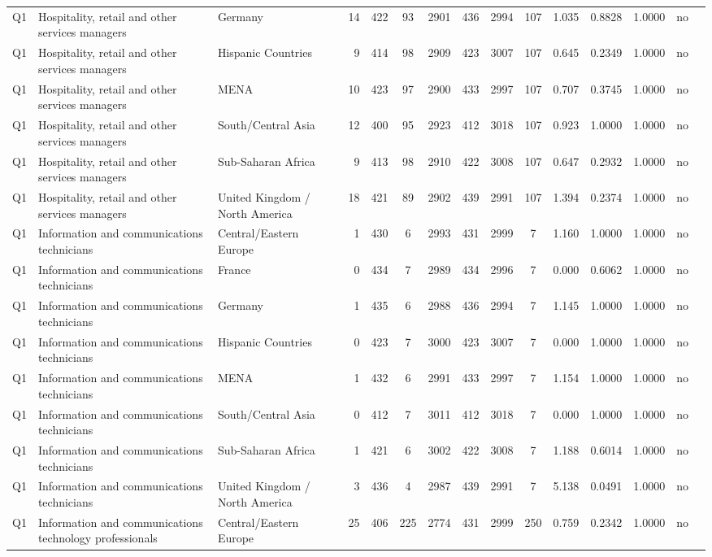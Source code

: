 \begin{longtable}{lllrcccccccccll}
Q1 & Hospitality, retail and other services managers & Germany & 14 & 422 & 93 & 2901 & 436 & 2994 & 107 & 1.035 & 0.8828 & 1.0000 & no \\
Q1 & Hospitality, retail and other services managers & Hispanic Countries & 9 & 414 & 98 & 2909 & 423 & 3007 & 107 & 0.645 & 0.2349 & 1.0000 & no \\
Q1 & Hospitality, retail and other services managers & MENA & 10 & 423 & 97 & 2900 & 433 & 2997 & 107 & 0.707 & 0.3745 & 1.0000 & no \\
Q1 & Hospitality, retail and other services managers & South/Central Asia & 12 & 400 & 95 & 2923 & 412 & 3018 & 107 & 0.923 & 1.0000 & 1.0000 & no \\
Q1 & Hospitality, retail and other services managers & Sub-Saharan Africa & 9 & 413 & 98 & 2910 & 422 & 3008 & 107 & 0.647 & 0.2932 & 1.0000 & no \\
Q1 & Hospitality, retail and other services managers & United Kingdom / North America & 18 & 421 & 89 & 2902 & 439 & 2991 & 107 & 1.394 & 0.2374 & 1.0000 & no \\
Q1 & Information and communications technicians & Central/Eastern Europe & 1 & 430 & 6 & 2993 & 431 & 2999 & 7 & 1.160 & 1.0000 & 1.0000 & no \\
Q1 & Information and communications technicians & France & 0 & 434 & 7 & 2989 & 434 & 2996 & 7 & 0.000 & 0.6062 & 1.0000 & no \\
Q1 & Information and communications technicians & Germany & 1 & 435 & 6 & 2988 & 436 & 2994 & 7 & 1.145 & 1.0000 & 1.0000 & no \\
Q1 & Information and communications technicians & Hispanic Countries & 0 & 423 & 7 & 3000 & 423 & 3007 & 7 & 0.000 & 1.0000 & 1.0000 & no \\
Q1 & Information and communications technicians & MENA & 1 & 432 & 6 & 2991 & 433 & 2997 & 7 & 1.154 & 1.0000 & 1.0000 & no \\
Q1 & Information and communications technicians & South/Central Asia & 0 & 412 & 7 & 3011 & 412 & 3018 & 7 & 0.000 & 1.0000 & 1.0000 & no \\
Q1 & Information and communications technicians & Sub-Saharan Africa & 1 & 421 & 6 & 3002 & 422 & 3008 & 7 & 1.188 & 0.6014 & 1.0000 & no \\
Q1 & Information and communications technicians & United Kingdom / North America & 3 & 436 & 4 & 2987 & 439 & 2991 & 7 & 5.138 & 0.0491 & 1.0000 & no \\
Q1 & Information and communications technology professionals & Central/Eastern Europe & 25 & 406 & 225 & 2774 & 431 & 2999 & 250 & 0.759 & 0.2342 & 1.0000 & no \\

\end{longtable}
